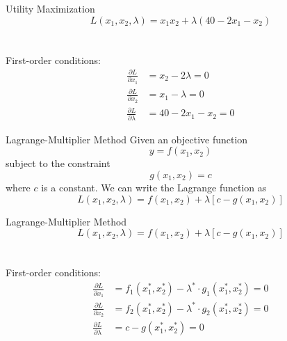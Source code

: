 \documentclass{./../../Latex/teaching_slides}
\begin{document}
\begin{frame}{Utility Maximization}
$$ L(x_1, x_2, \lambda) = x_1 x_2 + \lambda(40-2x_1-x_2) $$ \\~\\

First-order conditions:
\begin{align*}
\frac{\partial L}{\partial x_1} &= x_2-2 \lambda = 0 \\ 
\frac{\partial L}{\partial x_2} &= x_1- \lambda = 0 \\ 
\frac{\partial L}{\partial \lambda} &= 40-2x_1-x_2 = 0 
\end{align*}
\end{frame}

\begin{frame}{Lagrange-Multiplier Method}
Given an objective function
$$
y=f(x_1, x_2)
$$
subject to the constraint
$$
g(x_1, x_2)=c
$$
where $c$ is a constant. We can write the Lagrange function as
$$
L(x_1,x_2,\lambda)=f(x_1, x_2)+\lambda[c-g(x_1, x_2)]
$$
\end{frame}

\begin{frame}{Lagrange-Multiplier Method}
$$
L(x_1,x_2,\lambda)=f(x_1, x_2)+\lambda[c-g(x_1, x_2)]
$$ \\~\\
First-order conditions:
\begin{align*}
\frac{\partial L}{\partial x_1} &= f_1(x_1^*, x_2^*)- \lambda^* \cdot g_1(x_1^*, x_2^*) = 0 \\ 
\frac{\partial L}{\partial x_2} &= f_2(x_1^*, x_2^*)- \lambda^* \cdot g_2(x_1^*, x_2^*) = 0 \\ 
\frac{\partial L}{\partial \lambda} &= c-g(x_1^*, x_2^*) = 0 
\end{align*}
\end{frame}
\end{document}
